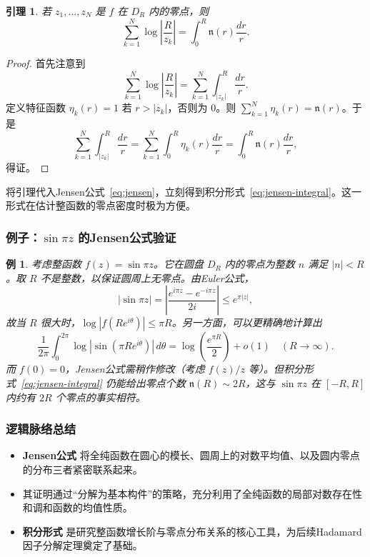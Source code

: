 \documentclass[UTF8]{ctexart}
\newtheorem{lemma}[theorem]{引理}
\newtheorem{example}{例}[section]
\numberwithin{equation}{section}
\begin{document}
\begin{lemma}\label{lem:zero-sum}
若 $z_1,\dots,z_N$ 是 $f$ 在 $D_R$ 内的零点，则
\[
\sum_{k=1}^N \log\left|\frac{R}{z_k}\right| = \int_0^R \mathfrak{n}(r) \frac{dr}{r}.
\]
\end{lemma}
\begin{proof}
首先注意到
\[
\sum_{k=1}^N \log\left|\frac{R}{z_k}\right| = \sum_{k=1}^N \int_{|z_k|}^R \frac{dr}{r}.
\]
定义特征函数 $\eta_k(r) = 1$ 若 $r > |z_k|$，否则为 $0$。则 $\sum_{k=1}^N \eta_k(r) = \mathfrak{n}(r)$。于是
\[
\sum_{k=1}^N \int_{|z_k|}^R \frac{dr}{r} = \sum_{k=1}^N \int_0^R \eta_k(r)\frac{dr}{r} = \int_0^R \mathfrak{n}(r)\frac{dr}{r},
\]
得证。
\end{proof}

将引理代入Jensen公式~\eqref{eq:jensen}，立刻得到积分形式~\eqref{eq:jensen-integral}。这一形式在估计整函数的零点密度时极为方便。

\subsubsection{例子：$\sin \pi z$ 的Jensen公式验证}

\begin{example}
考虑整函数 $f(z) = \sin \pi z$。它在圆盘 $D_R$ 内的零点为整数 $n$ 满足 $|n|<R$。取 $R$ 不是整数，以保证圆周上无零点。由Euler公式，
\[
|\sin \pi z| = \left| \frac{e^{i\pi z} - e^{-i\pi z}}{2i} \right| \le e^{\pi |z|},
\]
故当 $R$ 很大时，$\log|f(Re^{i\theta})| \le \pi R$。另一方面，可以更精确地计算出
\[
\frac{1}{2\pi} \int_0^{2\pi} \log|\sin(\pi R e^{i\theta})| \, d\theta = \log\left(\frac{e^{\pi R}}{2}\right) + o(1) \quad (R\to\infty).
\]
而 $f(0)=0$，Jensen公式需稍作修改（考虑 $f(z)/z$ 等）。但积分形式~\eqref{eq:jensen-integral} 仍能给出零点个数 $\mathfrak{n}(R) \sim 2R$，这与 $\sin \pi z$ 在 $[-R,R]$ 内约有 $2R$ 个零点的事实相符。
\end{example}

\subsubsection{逻辑脉络总结}

\begin{itemize}
    \item \textbf{Jensen公式} 将全纯函数在圆心的模长、圆周上的对数平均值、以及圆内零点的分布三者紧密联系起来。
    \item 其证明通过“分解为基本构件”的策略，充分利用了全纯函数的局部对数存在性和调和函数的均值性质。
    \item \textbf{积分形式} 是研究整函数增长阶与零点分布关系的核心工具，为后续Hadamard因子分解定理奠定了基础。
\end{itemize}
\end{document}
